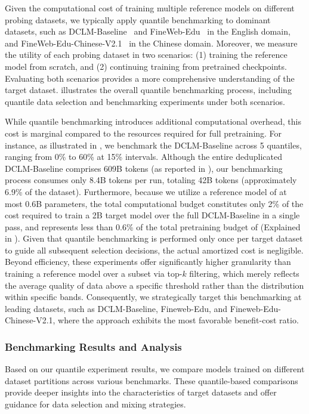 Given the computational cost of training multiple reference models on different probing datasets, we typically apply quantile benchmarking to dominant datasets, such as DCLM-Baseline~\cite{DCLM} and FineWeb-Edu~\cite{fineweb} in the English domain, and FineWeb-Edu-Chinese-V2.1~\cite{fineweb-edu-chinese} in the Chinese domain. Moreover, we measure the utility of each probing dataset in two scenarios: (1) training the reference model from scratch, and (2) continuing training from pretrained checkpoints. Evaluating both scenarios provides a more comprehensive understanding of the target dataset.  illustrates the overall quantile benchmarking process, including quantile data selection and benchmarking experiments under both scenarios. 

While quantile benchmarking introduces additional computational overhead, this cost is marginal compared to the resources required for full pretraining.
For instance, as illustrated in , we benchmark the DCLM-Baseline across 5 quantiles, ranging from 0\% to 60\% at 15\% intervals.
Although the entire deduplicated DCLM-Baseline comprises 609B tokens (as reported in ), our benchmarking process consumes only 8.4B tokens per run, totaling 42B tokens (approximately 6.9\% of the dataset).
Furthermore, because we utilize a reference model of at most 0.6B parameters, the total computational budget constitutes only 2\% of the cost required to train a 2B target model over the full DCLM-Baseline in a single pass, and represents less than 0.6\% of the total pretraining budget of \sys (Explained in ).
Given that quantile benchmarking is performed only once per target dataset to guide all subsequent selection decisions, the actual amortized cost is negligible.
Beyond efficiency, these experiments offer significantly higher granularity than training a reference model over a subset via top-$k$ filtering, which merely reflects the average quality of data above a specific threshold rather than the distribution within specific bands.
Consequently, we strategically target this benchmarking at leading datasets, such as DCLM-Baseline, Fineweb-Edu, and Fineweb-Edu-Chinese-V2.1, where the approach exhibits the most favorable benefit-cost ratio.


\subsubsection{Benchmarking Results and Analysis}
Based on our quantile experiment results, we compare models trained on different dataset partitions across various benchmarks. These quantile-based comparisons provide deeper insights into the characteristics of target datasets and offer guidance for data selection and mixing strategies.


